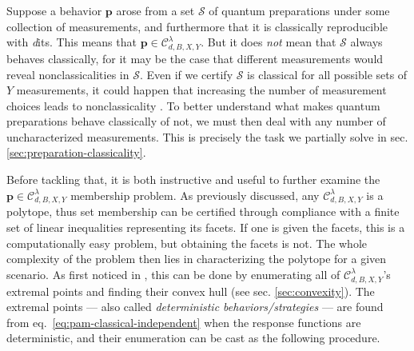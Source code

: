    Suppose a behavior $\mathbf{p}$ arose from a set $\mathcal{S}$ of quantum preparations under some collection of measurements, and furthermore that it is classically reproducible with \emph{d}its. This means that $\mathbf{p} \in \mathcal{C}_{d,B,X,Y}^\lambda$. But it does \emph{not} mean that $\mathcal{S}$ always behaves classically, for it may be the case that different measurements would reveal nonclassicalities in $\mathcal{S}$. Even if we certify $\mathcal{S}$ is classical for all possible sets of $Y$ measurements, it could happen that increasing the number of measurement choices leads to nonclassicality \cite{poderini_pamcriteria_2020}. To better understand what makes quantum preparations behave classically of not, we must then deal with any number of uncharacterized measurements. This is precisely the task we partially solve in sec. \ref{sec:preparation-classicality}. %

    Before tackling that, it is both instructive and useful to further examine the $\mathbf{p} \in \mathcal{C}_{d,B,X,Y}^\lambda$ membership problem. As previously discussed, any $\mathcal{C}_{d,B,X,Y}^\lambda$ is a polytope, thus set membership can be certified through compliance with a finite set of linear inequalities representing its facets. If one is given the facets, this is a computationally easy problem, but obtaining the facets is not. The whole complexity of the problem then lies in characterizing the polytope for a given scenario. As first noticed in \cite{gallego_pam_2010}, this can be done by enumerating all of $\mathcal{C}_{d,B,X,Y}^\lambda$'s extremal points and finding their convex hull (see sec. \ref{sec:convexity}). The extremal points --- also called \emph{deterministic behaviors/strategies} --- are found from eq.~\eqref{eq:pam-classical-independent} when the response functions are deterministic, and their enumeration can be cast as the following procedure.

